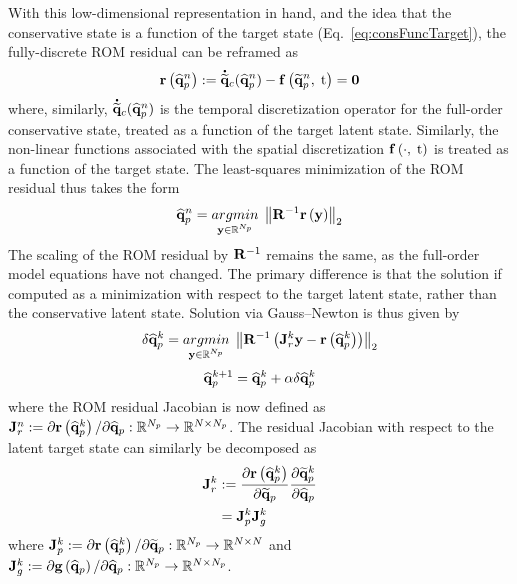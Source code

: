 With this low-dimensional representation in hand, and the idea that the conservative state is a function of the target state (Eq.~\ref{eq:consFuncTarget}), the fully-discrete ROM residual can be reframed as
%
\begin{equation}
    \mathbf{r}\left(\mathbf{\widehat{q}}_{p}^{n}\right) := \accentset{\mbox{\large\bfseries .}}{\mathbf{\widetilde{q}}}_{c}(\mathbf{\widehat{q}}_{p}^{n}) - \mathbf{f} \left(\mathbf{\widetilde{q}}_{p}^{n}, \; \text{t}\right) = \mathbf{0}
\end{equation}
%
where, similarly, $\accentset{\mbox{\large\bfseries .}}{\mathbf{\widetilde{q}}}_{c}(\mathbf{\widehat{q}}_{p}^{n})$ is the temporal discretization operator for the full-order conservative state, treated as a function of the target latent state. Similarly, the non-linear functions associated with the spatial discretization $ \mathbf{f} \left(\cdot, \; \text{t}\right)$ is treated as a function of the target state. The least-squares minimization of the ROM residual thus takes the form
%
\begin{equation}\label{eq:mplsvtLS}
    \primVecCoef^{\timeIdx} = \argmin{\dummyVec \inROne{\numPrimModes}} \left\Vert \resScaleInv \resFunc{\dummyVec} \right\Vert_2
\end{equation}
%
The scaling of the ROM residual by $\resScaleInv$ remains the same, as the full-order model equations have not changed. The primary difference is that the solution if computed as a minimization with respect to the target latent state, rather than the conservative latent state. Solution via Gauss--Newton is thus given by
%
\begin{equation}\label{eq:mplsvtLSLin}
    \delta \primVecCoef^{\newtonIdx} = \argmin{\dummyVec \inROne{\numPrimModes}} \left\Vert \resScaleInv \left(\jacobRes^{\newtonIdx} \dummyVec - \resFunc{\primVecCoef^{\newtonIdx}}\right) \right\Vert_2
\end{equation}
\begin{equation}
    \mathbf{\widehat{q}}_{p}^{k + 1} = \mathbf{\widehat{q}}_{p}^{k} + \alpha \delta \mathbf{\widehat{q}}_{p}^{k}
\end{equation}
%
where the ROM residual Jacobian is now defined as $\mathbf{J}_{r}^{n} := \partial \mathbf{r}\left(\mathbf{\widehat{q}}_{p}^{k}\right) / \partial \mathbf{\widehat{q}}_{p}: \mathbb{R}^{N_p} \rightarrow \mathbb{R}^{N \times N_p}$. The residual Jacobian with respect to the latent target state can similarly be decomposed as
%
\begin{align}
    \mathbf{J}_{r}^{k} &:= \frac{\partial \mathbf{r}\left(\mathbf{\widehat{q}}_{p}^{k}\right)}{\partial \mathbf{\widetilde{q}}_{p}} \frac{\partial \mathbf{\widetilde{q}}_{p}^{k}}{\partial \mathbf{\widehat{q}}_{p}} \\
    &= \mathbf{J}_{p}^{k} \mathbf{J}_{g}^{k}
\end{align}
%
where $\mathbf{J}_{p}^{k} := \partial \mathbf{r}\left(\mathbf{\widehat{q}}_{p}^{k}\right) / \partial \mathbf{\widetilde{q}}_{p}: \mathbb{R}^{N_p} \rightarrow \mathbb{R}^{N \times N}$ and $\mathbf{J}_{g}^{k} := \partial \mathbf{g} \left(\mathbf{\widehat{q}}_{p}\right) / \partial \mathbf{\widehat{q}}_{p}: \mathbb{R}^{N_p} \rightarrow \mathbb{R}^{N \times N_p}$.

